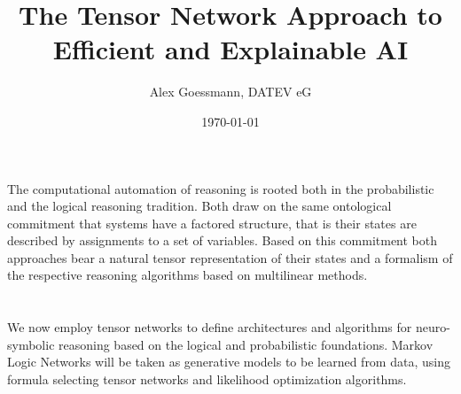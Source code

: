 \documentclass[aps,onecolumn,nofootinbib,pra]{article}
\begin{document}
    \title{The Tensor Network Approach to Efficient and Explainable AI}
    \author{Alex Goessmann, DATEV eG}

    \maketitle
    \date{\today}

    \begin{abstract}
        
    \end{abstract}

    \tableofcontents

    
    
    

    \part{\partonetext}\label{par:one}

    The computational automation of reasoning is rooted both in the probabilistic and the logical reasoning tradition.
    Both draw on the same ontological commitment that systems have a factored structure, that is their states are described by assignments to a set of variables.
    Based on this commitment both approaches bear a natural tensor representation of their states and a formalism of the respective reasoning algorithms based on multilinear methods.

    
    

    
    

    \part{\parttwotext}\label{par:two}

    We now employ tensor networks to define architectures and algorithms for neuro-symbolic reasoning based on the logical and probabilistic foundations.
    Markov Logic Networks will be taken as generative models to be learned from data, using formula selecting tensor networks and likelihood optimization algorithms.

    

    
    
\end{document}
